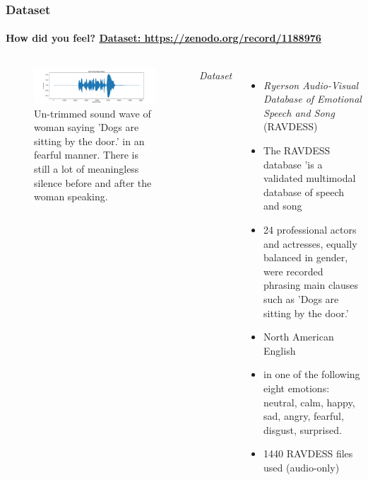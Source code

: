 \documentclass[10pt,usepdftitle=false,aspectratio=169]{beamer}
\begin{document}
\begin{frame}\frametitle{Dataset}
    \framesubtitle{How did you feel?  \hspace*{30em} \href{https://zenodo.org/record/1188976}{Dataset: https://zenodo.org/record/1188976}}
    
    \vspace{1.5em}


  
	\begin{columns}
		\begin{figure}
			\centering
			\includegraphics[width=.8\textwidth]{figures/untr_raw_wave.pdf}
			\caption{Un-trimmed sound wave of woman saying 'Dogs are sitting by the door.' in an fearful manner. There is still a lot of meaningless silence before and after the woman speaking. }
			\label{fig:untrimmed sw}
		\end{figure}
\emph{Dataset}
\begin{itemize}
	\item \textit{Ryerson Audio-Visual Database of Emotional Speech and Song} (RAVDESS)
	\item The RAVDESS database 'is a validated multimodal database of speech and song 
	\item  24 professional actors and actresses, equally balanced in gender, were recorded phrasing main clauses such as  'Dogs are sitting by the door.' 
	\item  North American English 
	\item in one of the following eight emotions: neutral, calm, happy, sad, angry, fearful, disgust, surprised.
	\item  1440 RAVDESS files used  (audio-only) 
	
\end{itemize}
	\end{columns}


\end{frame}
\end{document}
